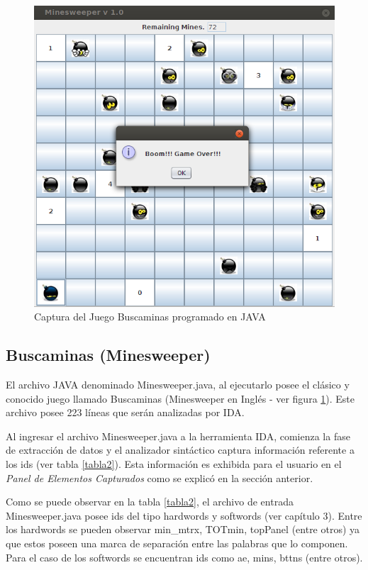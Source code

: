\documentclass[a4paper,12pt]{report}
\begin{document}
\begin{figure}[h] %
\centerline{%
\includegraphics[scale= 0.5]{./caso_01.png}
}
\caption{Captura del Juego Buscaminas programado en JAVA}
\label{caso1}
\end{figure}

\subsection{Buscaminas (Minesweeper)}

El archivo JAVA denominado Minesweeper.java, al ejecutarlo posee el clásico y conocido juego llamado Buscaminas (Minesweeper en Inglés - ver figura \ref{caso1}). Este archivo posee 223 líneas que serán analizadas por IDA.

Al ingresar el archivo Minesweeper.java a la herramienta IDA, comienza la fase de extracción de datos y el analizador sintáctico captura información referente a los ids (ver tabla \ref{tabla2}). Esta información es exhibida para el usuario en el \textit{Panel de Elementos Capturados} como se explicó en la sección anterior.

Como se puede observar en la tabla \ref{tabla2}, el archivo de entrada Minesweeper.java posee ids del tipo hardwords y softwords (ver capítulo 3). Entre los hardwords se pueden observar \textsf{min\_mtrx}, \textsf{TOTmin}, \textsf{topPanel} (entre otros) ya que estos poseen una marca de separación entre las palabras que lo componen. Para el caso de los softwords se encuentran ids como \textsf{ae}, \textsf{mins}, \textsf{bttns} (entre otros).
\end{document}
